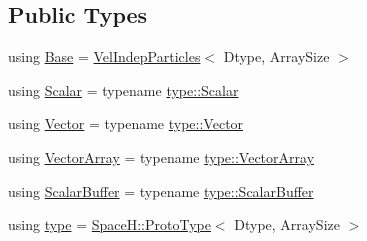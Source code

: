 \subsection*{Public Types}
\begin{DoxyCompactItemize}
\item 
using \mbox{\hyperlink{class_space_h_1_1_vel_dep_particles_a811be78cacdfc2138249181d2c879c3e}{Base}} = \mbox{\hyperlink{class_space_h_1_1_vel_indep_particles}{Vel\+Indep\+Particles}}$<$ Dtype, Array\+Size $>$
\item 
using \mbox{\hyperlink{class_space_h_1_1_vel_dep_particles_ad0f03dd9e570b54c5c6c03589981f6b5}{Scalar}} = typename \mbox{\hyperlink{struct_space_h_1_1_proto_type_af3c8245d83d9db64749882920de5c274}{type\+::\+Scalar}}
\item 
using \mbox{\hyperlink{class_space_h_1_1_vel_dep_particles_a1533a108b1dfc2197e0cc5ae56972e51}{Vector}} = typename \mbox{\hyperlink{struct_space_h_1_1_proto_type_a316b81f4660b2b4fab14a8e1f23b6089}{type\+::\+Vector}}
\item 
using \mbox{\hyperlink{class_space_h_1_1_vel_dep_particles_afabe6c07ec68aec77523491650dfc50d}{Vector\+Array}} = typename \mbox{\hyperlink{struct_space_h_1_1_proto_type_a622b8e122b33bb4966a02299fb7b82d6}{type\+::\+Vector\+Array}}
\item 
using \mbox{\hyperlink{class_space_h_1_1_vel_dep_particles_ae9a8f53480bc6284b90a7a48f49bb7d0}{Scalar\+Buffer}} = typename \mbox{\hyperlink{struct_space_h_1_1_proto_type_a62c491884996da10377d348a5aabad86}{type\+::\+Scalar\+Buffer}}
\item 
using \mbox{\hyperlink{class_space_h_1_1_vel_dep_particles_a09aa167b5fb1b203ab021220601ed74c}{type}} = \mbox{\hyperlink{struct_space_h_1_1_proto_type}{Space\+H\+::\+Proto\+Type}}$<$ Dtype, Array\+Size $>$
\end{DoxyCompactItemize}
